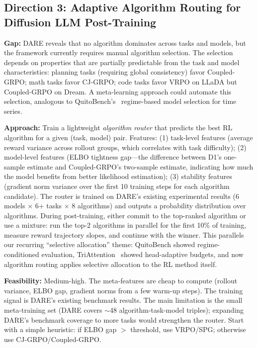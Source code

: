 \documentclass[11pt]{article}
\begin{document}
\subsection{Direction 3: Adaptive Algorithm Routing for Diffusion LLM Post-Training}

\textbf{Gap:} DARE reveals that no algorithm dominates across tasks and models, but the framework currently requires manual algorithm selection. The selection depends on properties that are partially predictable from the task and model characteristics: planning tasks (requiring global consistency) favor Coupled-GRPO; math tasks favor CJ-GRPO; code tasks favor VRPO on LLaDA but Coupled-GRPO on Dream. A meta-learning approach could automate this selection, analogous to QuitoBench's~\cite{quitobench} regime-based model selection for time series.

\textbf{Approach:} Train a lightweight \textit{algorithm router} that predicts the best RL algorithm for a given (task, model) pair. Features: (1) task-level features (average reward variance across rollout groups, which correlates with task difficulty); (2) model-level features (ELBO tightness gap---the difference between D1's one-sample estimate and Coupled-GRPO's two-sample estimate, indicating how much the model benefits from better likelihood estimation); (3) stability features (gradient norm variance over the first 10 training steps for each algorithm candidate). The router is trained on DARE's existing experimental results (6 models $\times$ 6+ tasks $\times$ 8 algorithms) and outputs a probability distribution over algorithms. During post-training, either commit to the top-ranked algorithm or use a mixture: run the top-2 algorithms in parallel for the first 10\% of training, measure reward trajectory slopes, and continue with the winner. This parallels our recurring ``selective allocation'' theme: QuitoBench showed regime-conditioned evaluation, TriAttention~\cite{triattention} showed head-adaptive budgets, and now algorithm routing applies selective allocation to the RL method itself.

\textbf{Feasibility:} Medium-high. The meta-features are cheap to compute (rollout variance, ELBO gap, gradient norms from a few warm-up steps). The training signal is DARE's existing benchmark results. The main limitation is the small meta-training set (DARE covers $\sim$48 algorithm-task-model triples); expanding DARE's benchmark coverage to more tasks would strengthen the router. Start with a simple heuristic: if ELBO gap $>$ threshold, use VRPO/SPG; otherwise use CJ-GRPO/Coupled-GRPO.
\end{document}
